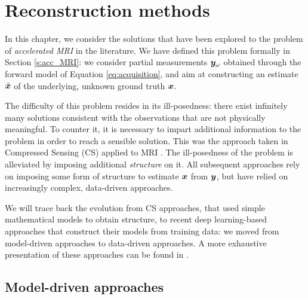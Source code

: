 \chapter{Reconstruction methods}\label{chap:rec}

In this chapter, we consider the solutions that have been explored to the problem of \textit{accelerated MRI} in the literature. We have defined this problem formally in Section \ref{s:acc_MRI}: we consider partial measurements ${\bm{y}}_\omega$ obtained through the forward model of Equation \ref{eq:acquisition}, and aim at constructing an estimate $\hat{{\bm{x}}}$ of the underlying, unknown ground truth ${\bm{x}}$.  

The difficulty of this problem resides in its ill-posedness: there exist infinitely many solutions consistent with the observations that are not physically meaningful. To counter it, it is necessary to impart additional information to the problem in order to reach a sensible solution. This was the approach taken in  Compressed Sensing (CS) applied to MRI \citep{lustig2008compressed}. The ill-posedness of the problem is alleviated by imposing additional \textit{structure} on it. All subsequent approaches rely on imposing some form of structure to estimate ${\bm{x}}$ from ${\bm{y}}$, but have relied on increasingly complex, data-driven approaches. 

We will trace back the evolution from CS approaches, that used simple mathematical models to obtain structure, to recent deep learning-based approaches that construct their models from training data: we moved from model-driven approaches to data-driven approaches. A more exhaustive presentation of these approaches can be found in \citet{ravishankar2019image, doneva2020mathematical}.


\section{Model-driven approaches}

